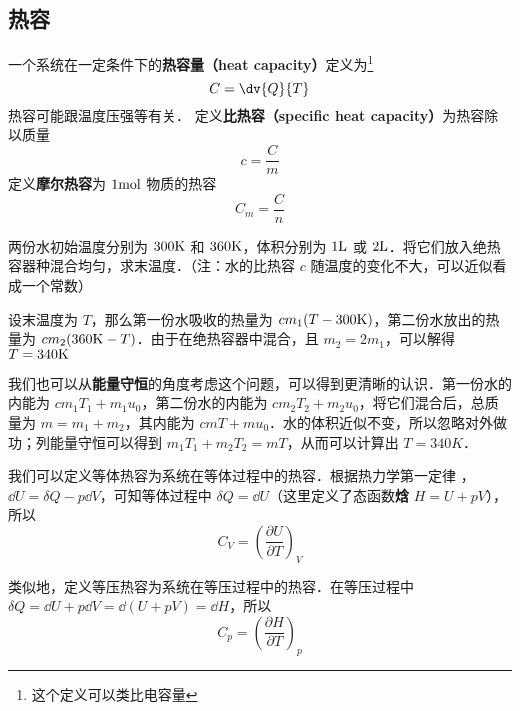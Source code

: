 
\begin{issues}
\issueTODO
\end{issues}
\subsection{热容}
一个系统在一定条件下的\textbf{热容量（heat capacity）}定义为\footnote{这个定义可以类比电容量}
\begin{equation}
C = \dv{Q}{T}
\end{equation}
热容可能跟温度压强等有关． 定义\textbf{比热容（specific heat capacity）}为热容除以质量
\begin{equation}
c = \frac{C}{m}
\end{equation}
定义\textbf{摩尔热容}为 $1 \rm{mol}$ 物质的热容
\begin{equation}
C_m=\frac{C}{n}
\end{equation}

\begin{example}{}
两份水初始温度分别为 $300\rm{K}$ 和 $360\rm{K}$，体积分别为 $1\rm{L}$ 或 $2 \rm{L}$．将它们放入绝热容器种混合均匀，求末温度．（注：水的比热容 $c$ 随温度的变化不大，可以近似看成一个常数）

设末温度为 $T$，那么第一份水吸收的热量为 $c m_1(T-300\rm{K})$，第二份水放出的热量为 $cm_2(360{\rm{K}}-T)$．由于在绝热容器中混合，且 $m_2=2m_1$，可以解得 $T=340\rm{K}$

我们也可以从\textbf{能量守恒}的角度考虑这个问题，可以得到更清晰的认识．第一份水的内能为 $cm_1T_1+m_1u_0$，第二份水的内能为 $cm_2T_2+m_2u_0$，将它们混合后，总质量为 $m=m_1+m_2$，其内能为 $cmT+mu_0$．水的体积近似不变，所以忽略对外做功；列能量守恒可以得到 $m_1T_1+m_2T_2=mT$，从而可以计算出 $T=340K$．
\end{example}

我们可以定义等体热容为系统在等体过程中的热容．根据热力学第一定律 ，$\dd U=\delta Q-p\dd V$，可知等体过程中 $\delta Q=\dd U$（这里定义了态函数\textbf{焓} $H=U+pV$），所以
\begin{equation}\label{ThCapa_eq1}
C_V=\left(\frac{\partial U}{\partial T}\right)_V
\end{equation}

类似地，定义等压热容为系统在等压过程中的热容．在等压过程中 $\delta Q=\dd U+p\dd V=\dd (U+pV)=\dd H$，所以
\begin{equation}\label{ThCapa_eq2}
C_p=\left(\frac{\partial H}{\partial T}\right)_p
\end{equation}

